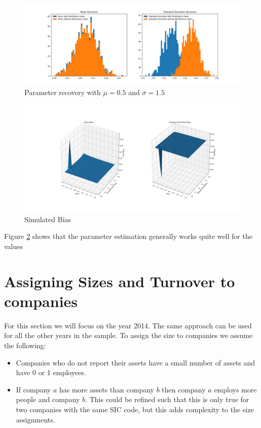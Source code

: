 \documentclass[a4paper,10pt]{article}
\begin{document}
   \begin{figure}[!ht]
      \caption{Parameter recovery with $\mu = 0.5$ and $\sigma = 1.5$}
      \label{mle_results}
      \includegraphics[width=\textwidth]{graphs/recovered_parameter_distribution}
   \end{figure}
   \begin{figure}[!ht]
      \begin{center}
         \caption{Simulated Bias}
         \label{bias}
         \includegraphics[width=\textwidth]{graphs/bias}
      \end{center}
   \end{figure}
   Figure \ref{bias} shows that the parameter estimation generally works quite well for the values 

   \section{Assigning Sizes and Turnover to companies}
   For this section we will focus on the year 2014. The same approach can be used for all the other years in the sample. To assign the size to companies we assume the following:
   \begin{itemize}
      \item Companies who do not report their assets have a small number of assets and have 0 or 1 employees.
      \item If company $a$ has more assets than company $b$ then company $a$ employs more people and company $b$. This could be refined such that this is only true for two companies with the same SIC code, but this adds complexity to the size assignments.
   \end{itemize}
\end{document}
